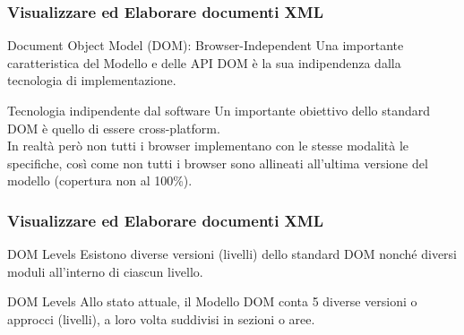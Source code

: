 \begin{frame}
    \frametitle{Visualizzare ed Elaborare documenti XML}
    \addtocounter{nframe}{1}
    

     \begin{block}{Document Object Model (DOM): Browser-Independent}
        Una importante caratteristica del Modello e delle API DOM è la sua indipendenza dalla tecnologia di implementazione.
        
     \end{block}

     \begin{block}{Tecnologia indipendente dal software}
        Un importante obiettivo dello standard DOM è quello di essere cross-platform. 
        \\In realtà però non tutti i browser implementano con le stesse modalità le specifiche, così come non tutti i browser sono allineati all'ultima versione del modello (copertura non al 100\%).
       
     \end{block}
     
\end{frame}


\begin{frame}
    \frametitle{Visualizzare ed Elaborare documenti XML}
    \addtocounter{nframe}{1}
    

     \begin{block}{DOM Levels}
       Esistono diverse versioni (livelli) dello standard DOM nonché diversi moduli all'interno di ciascun livello.
     \end{block}

     \begin{block}{DOM Levels}
       Allo stato attuale, il Modello DOM conta 5 diverse versioni o approcci (livelli), a loro volta suddivisi in sezioni o aree.
     \end{block}
     
\end{frame}

